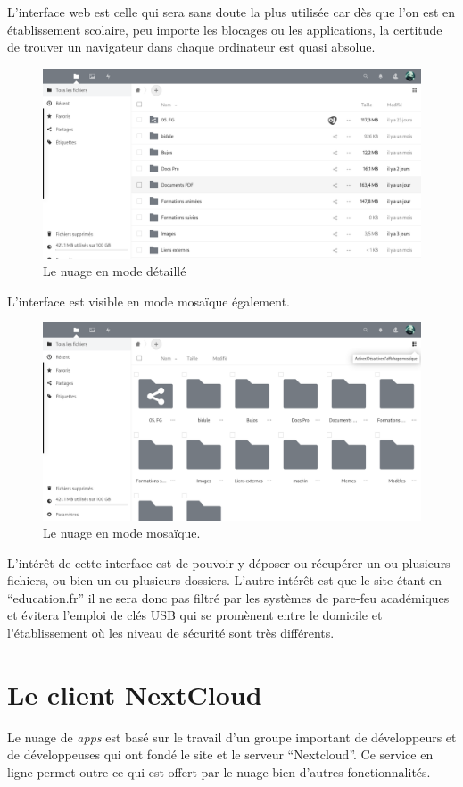 L'interface web est celle qui sera sans doute la plus utilisée car dès que l'on est en établissement scolaire, peu importe les blocages ou les applications, la certitude de trouver un navigateur dans chaque ordinateur est quasi absolue.
\begin{figure}
	\centering
	\includegraphics[width=\linewidth]{./Captures/nuage.accueil.png}
	\caption{Le nuage en mode détaillé}
\end{figure}
L'interface est visible en mode mosaïque également.
\begin{figure}
	\centering
	\includegraphics[width=\linewidth]{./Captures/nuage.accueil.mozaique.png}
	\caption{Le nuage en mode mosaïque.}
\end{figure}
L'intérêt de cette interface est de pouvoir y déposer ou récupérer un ou plusieurs fichiers, ou bien un ou plusieurs dossiers. 
L'autre intérêt est que le site étant en ``education.fr'' il ne sera donc pas filtré par les systèmes de pare-feu académiques et évitera l'emploi de clés USB qui se promènent entre le domicile et l'établissement où les niveau de sécurité sont très différents.

\section{Le client NextCloud}
Le nuage de \emph{apps} est basé sur le travail d'un groupe important de développeurs et de développeuses qui ont fondé le site et le serveur ``Nextcloud''. 
Ce service en ligne permet outre ce qui est offert par le nuage bien d'autres fonctionnalités. 

